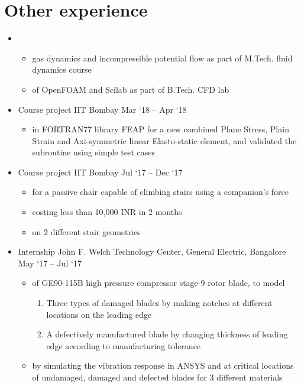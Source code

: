 \documentclass[a4paper,10pt]{article}
\newcommand{\of}{OpenFOAM}
\newcommand{\feap}{FEAP}
\begin{document}
\section{Other experience}
\begin{itemize}
	\item {}
	\begin{itemize}
		\item {} gas dynamics and incompressible potential flow as part of M.Tech. fluid dynamics course
		\item {} of \of{} and Scilab as part of B.Tech. CFD lab
	\end{itemize}
	\item {}
	{Course project}
	{IIT Bombay}
	{Mar `18 -- Apr `18}
	\begin{itemize}
		\item {} in FORTRAN77 library \feap{} for a new combined Plane Stress, Plain Strain and Axi-symmetric linear Elasto-static element, and validated the subroutine using simple test cases
	\end{itemize}
	\item {}
	{Course project}
	{IIT Bombay}
	{Jul `17 -- Dec `17}
	\begin{itemize}
		\item {} for a passive chair capable of climbing stairs using a companion's force
		\item {} costing less than 10,000 INR in 2 months
		\item {} on 2 different stair geometries
	\end{itemize}
	\item {}
	{Internship}
	{John F. Welch Technology Center, General Electric, Bangalore}
	{May `17 -- Jul `17}
	\begin{itemize}
		\item {} of GE90-115B high pressure compressor stage-9 rotor blade, to model
		\begin{enumerate}
			\item Three types of damaged blades by making notches at different locations on the leading edge
			\item A defectively manufactured blade by changing thickness of leading edge according to manufacturing tolerance
		\end{enumerate}
		\item {} by simulating the vibration response in ANSYS and  at critical locations of undamaged, damaged and defected blades for 3 different materials
	\end{itemize}
\end{itemize}
\end{document}
